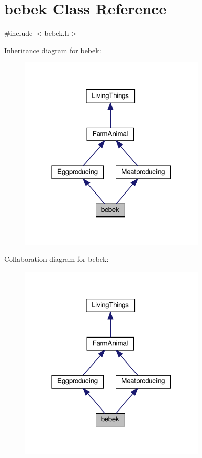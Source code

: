 \hypertarget{classbebek}{}\section{bebek Class Reference}
\label{classbebek}


{\ttfamily \#include $<$bebek.\+h$>$}



Inheritance diagram for bebek\+:
\nopagebreak
\begin{figure}[H]
\begin{center}
\leavevmode
\includegraphics[width=254pt]{classbebek__inherit__graph}
\end{center}
\end{figure}


Collaboration diagram for bebek\+:
\nopagebreak
\begin{figure}[H]
\begin{center}
\leavevmode
\includegraphics[width=254pt]{classbebek__coll__graph}
\end{center}
\end{figure}
